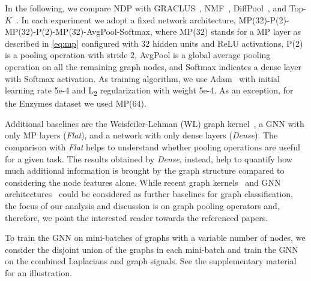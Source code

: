\documentclass[journal]{IEEEtran}
\begin{document}
In the following, we compare NDP with GRACLUS~\cite{defferrard2016convolutional}, NMF~\cite{bacciu2019non}, DiffPool~\cite{ying2018hierarchical}, and Top-$K$~\cite{graphunet}.
In each experiment we adopt a fixed network architecture, MP(32)-P(2)-MP(32)-P(2)-MP(32)-AvgPool-Softmax, where MP(32) stands for a MP layer as described in \eqref{eq:mp} configured with 32 hidden units and ReLU activations, P(2) is a pooling operation with stride 2, AvgPool is a global average pooling operation on all the remaining graph nodes, and Softmax indicates a dense layer with Softmax activation.
As training algorithm, we use Adam~\cite{kingma2014adam} with initial learning rate 5e-4 and L\textsubscript{2} regularization with weight 5e-4.
As an exception, for the Enzymes dataset we used MP(64). 

Additional baselines are the Weisfeiler-Lehman (WL) graph kernel~\cite{shervashidze2011weisfeiler}, a GNN with only MP layers (\textit{Flat}), and a network with only dense layers (\textit{Dense}).
The comparison with \textit{Flat} helps to understand whether pooling operations are useful for a given task.
The results obtained by \textit{Dense}, instead, help to quantify how much additional information is brought by the graph structure compared to considering the node features alone.
While recent graph kernels~\cite{yanardag2015deep, martino2019hyper, togninalli2019wasserstein} and GNN architectures~\cite{bai2020learning, jiang2019walk} could be considered as further baselines for graph classification, the focus of our analysis and discussion is on graph pooling operators and, therefore, we point the interested reader towards the referenced papers. 

To train the GNN on mini-batches of graphs with a variable number of nodes, we consider the disjoint union of the graphs in each mini-batch and train the GNN on the combined Laplacians and graph signals.
See the supplementary material for an illustration.
\end{document}
